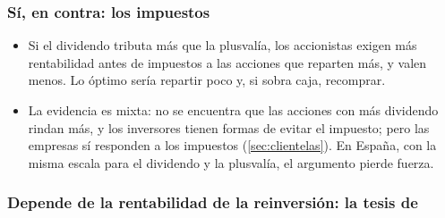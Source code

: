 \documentclass[11pt]{article}
\begin{document}
\subsubsection{Sí, en contra: los impuestos}\label{sec:impuestos-dividendos}

\begin{itemize}
\item Si el dividendo tributa más que la plusvalía, los accionistas exigen más rentabilidad antes de impuestos a las acciones que reparten más, y valen menos\nocite{Brennan1970Taxes}. Lo óptimo sería repartir poco y, si sobra caja, recomprar.
\item La evidencia es mixta: no se encuentra que las acciones con más dividendo rindan más\nocite{BlackScholes1974Effects}, y los inversores tienen formas de evitar el impuesto\nocite{MillerScholes1978Dividends}; pero las empresas sí responden a los impuestos (\ref{sec:clientelas}). En España, con la misma escala para el dividendo y la plusvalía, el argumento pierde fuerza.
\end{itemize}

\subsubsection{Depende de la rentabilidad de la reinversión: la tesis de }\label{sec:walter}
\end{document}
